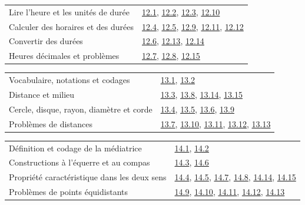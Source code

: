 \begin{tabularx}{\linewidth}{@{}Yl@{}}\toprule
Lire l’heure et les unités de durée & \hyperref[exo-12-1]{12.1}, \hyperref[exo-12-2]{12.2}, \hyperref[exo-12-3]{12.3}, \hyperref[exo-12-10]{12.10}\\[2mm]
Calculer des horaires et des durées & \hyperref[exo-12-4]{12.4}, \hyperref[exo-12-5]{12.5}, \hyperref[exo-12-9]{12.9}, \hyperref[exo-12-11]{12.11}, \hyperref[exo-12-12]{12.12}\\[2mm]
Convertir des durées & \hyperref[exo-12-6]{12.6}, \hyperref[exo-12-13]{12.13}, \hyperref[exo-12-14]{12.14}\\[2mm]
Heures décimales et problèmes & \hyperref[exo-12-7]{12.7}, \hyperref[exo-12-8]{12.8}, \hyperref[exo-12-15]{12.15}\\[2mm]
\bottomrule\end{tabularx}\par\vspace{4mm}
\clearpage
{}\fontsize{10}{13}\selectfont
{}\begin{tabularx}{\linewidth}{@{}Yl@{}}\toprule
Vocabulaire, notations et codages & \hyperref[exo-13-1]{13.1}, \hyperref[exo-13-2]{13.2}\\[2mm]
Distance et milieu & \hyperref[exo-13-3]{13.3}, \hyperref[exo-13-8]{13.8}, \hyperref[exo-13-14]{13.14}, \hyperref[exo-13-15]{13.15}\\[2mm]
Cercle, disque, rayon, diamètre et corde & \hyperref[exo-13-4]{13.4}, \hyperref[exo-13-5]{13.5}, \hyperref[exo-13-6]{13.6}, \hyperref[exo-13-9]{13.9}\\[2mm]
Problèmes de distances & \hyperref[exo-13-7]{13.7}, \hyperref[exo-13-10]{13.10}, \hyperref[exo-13-11]{13.11}, \hyperref[exo-13-12]{13.12}, \hyperref[exo-13-13]{13.13}\\[2mm]
\bottomrule\end{tabularx}\par\vspace{4mm}
\begin{tabularx}{\linewidth}{@{}Yl@{}}\toprule
Définition et codage de la médiatrice & \hyperref[exo-14-1]{14.1}, \hyperref[exo-14-2]{14.2}\\[2mm]
Constructions à l’équerre et au compas & \hyperref[exo-14-3]{14.3}, \hyperref[exo-14-6]{14.6}\\[2mm]
Propriété caractéristique dans les deux sens & \hyperref[exo-14-4]{14.4}, \hyperref[exo-14-5]{14.5}, \hyperref[exo-14-7]{14.7}, \hyperref[exo-14-8]{14.8}, \hyperref[exo-14-14]{14.14}, \hyperref[exo-14-15]{14.15}\\[2mm]
Problèmes de points équidistants & \hyperref[exo-14-9]{14.9}, \hyperref[exo-14-10]{14.10}, \hyperref[exo-14-11]{14.11}, \hyperref[exo-14-12]{14.12}, \hyperref[exo-14-13]{14.13}\\[2mm]
\bottomrule\end{tabularx}\par\vspace{4mm}
